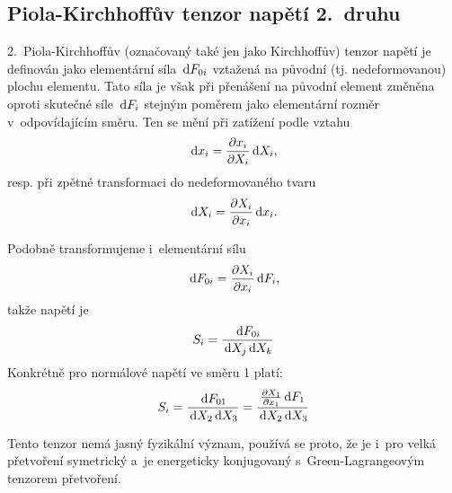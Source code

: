 
\subsection{Piola-Kirchhoffův tenzor napětí 2.~druhu}
2.~Piola-Kirchhoffův (označovaný také jen jako Kirchhoffův) tenzor napětí je definován jako elementární síla $\,\mathrm{d} F_{0i}$ vztažená na původní (tj. nedeformovanou) plochu elementu. Tato síla je však při přenášení na původní element změněna oproti skutečné síle $\,\mathrm{d} F_i$ stejným poměrem jako elementární rozměr v~odpovídajícím směru. Ten se mění při zatížení podle vztahu
\begin{equation}
	\,\mathrm{d} x_i = \frac{\partial x_i}{\partial X_i} \,\mathrm{d} X_i,
\end{equation}
resp. při zpětné transformaci do nedeformovaného tvaru
\begin{equation}
	\,\mathrm{d} X_i = \frac{\partial X_i}{\partial x_i} \,\mathrm{d} x_i.
\end{equation}

Podobně transformujeme i~elementární sílu
\begin{equation}
	\,\mathrm{d} F_{0i} = \frac{\partial X_i}{\partial x_i} \,\mathrm{d} F_i,
\end{equation}
takže  napětí je
\begin{equation}
	S_i = \frac{\,\mathrm{d} F_{0i}}{\,\mathrm{d} X_j \,\mathrm{d} X_k}
\end{equation}
Konkrétně pro normálové napětí ve směru 1 platí:
\begin{equation}
	S_i = \frac{\,\mathrm{d} F_{01}}{\,\mathrm{d} X_2 \,\mathrm{d} X_3}
	= \frac{\frac{\partial X_1}{\partial x_1} \,\mathrm{d} F_1}{\,\mathrm{d} X_2 \,\mathrm{d} X_3}
\end{equation}

Tento tenzor nemá jasný fyzikální význam, používá se proto, že je i~pro velká přetvoření symetrický a~je energeticky konjugovaný s~Green-Lagrangeovým tenzorem přetvoření.

